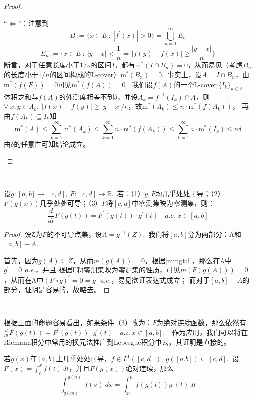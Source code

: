 \documentclass[color=green,thmcnt=section,lang=cn,12pt]{elegantbook}
\numberwithin{equation}{section}%
\numberwithin{figure}{section}%
\newcommand{\RR}{\mathbb{R}}
\newcommand{\ZZ}{\mathbb{Z}}
\newcommand{\any}{\forall \ }
\newcommand{\csf}[1]{\{#1_k\}_{k\in \ZZ_+}} %
\newcommand{\cu}[1]{\bigcup_{#1=1}^{\infty}} %
\newcommand{\cs}[1]{\sum_{#1=1}^{\infty}} %
\newcommand{\mx}[1]{\textrm{m}^*(#1)} %
\newcommand{\lcover}{\textrm{L-cover}} %
\begin{document}
\begin{proof}
\begin{enumerate}[(1)]
        ``$\Longleftarrow$''：注意到\begin{equation*}
            B:=\{x\in E\ :\ |f^{'}(x)|>0\}=\cu{n}E_n
        \end{equation*}
        \begin{equation*}
            E_n:=\{x\in E\ :\ |y-x|<\frac{1}{n}\Rightarrow |f(y)-f(x)|\geq \frac{|y-x|}{n}\}
        \end{equation*}
        断言，对于任意长度小于$1/n$的区间$I$，都有$\mx{I\cap B_n}=0$，从而易见（考虑$B_n$的长度小于$1/n$的区间构成的$\lcover$）$\mx{B_n}=0$.\ 
        事实上，设$A=I\cap B_n$，由$\mx{f(E)}=0$可见$\mx{f(A)}=0$，我们设$f(A)$的一个$\lcover\ \csf{I}$体积之和与$f(A)$的外测度相差不到$\delta$，并设$A_k=f^{-1}(I_k)\cap A$，则$\any x,y\in A_k,\ |f(x)-f(y)|\geq |y-x|/n$，故$\mx{A_k}\leq n\cdot \mx{f(A_k)}$，
        再由$f(A_k)\subseteq I_k$知
        \begin{equation*}
            \mx{A}\leq \cs{k}\mx{A_k}\leq \cs{k}n\cdot \mx{f(A_k)}\leq \cs{k}n\cdot \mx{I_k}\leq n\delta
        \end{equation*}
        由$\delta$的任意性可知结论成立。
    \end{enumerate}
\end{proof}
\ 



\begin{proposition}[复合函数求导]\label{fuhehanshuqiudao}
    设$g:[a,b]\to[c,d],\ F:[c,d]\to\RR$.\ 若：（1）$g,F$均几乎处处可导；（2）$F(g(x))$几乎处处可导；（3）$F$将$[c,d]$中零测集映为零测集，则：
    \begin{equation*}
        \frac{d}{dt}F(g(t))=F^{'}(g(t))\cdot g^{'}(t) \quad a.e.\ x\in[a,b]
    \end{equation*}
\end{proposition}
\begin{proof}
    设Z为$F$的不可导点集，设$A=g^{-1}(Z)$.\ 我们将$[a,b]$分为两部分：A和$[a,b]-A$.\ 


    首先，因为$g(A)\subseteq Z$，从而$m(g(A))=0$，根据\ref{mingti1}，那么在A中$g^{'}=0\ \ a.e.$，并且
    根据F将零测集映为零测集的性质，可见$m(F(g(A)))=0$，从而在A中$(F\circ g)^{'}=0=g^{'}\ \ a.e.$，易见欲证表达式成立；
    而对于$[a,b]-A$的部分，证明是容易的，故略去。
\end{proof}
\ 


根据上面的命题容易看出，如果条件（3）改为：$F$为绝对连续函数，那么依然有$  \frac{d}{dt}F(g(t))=F^{'}(g(t))\cdot g^{'}(t) \quad a.e.\ x\in[a,b]$.\ 
\ 作为应用，我们可以将在Riemann积分中常用的换元法推广到Lebesgue积分中去，其证明是直接的。
\begin{proposition}[换元积分]
    若$g(x)$在$[a,b]$上几乎处处可导，$f\in L^1([c,d]),\ g([a.b])\subseteq [c,d]$.\ 设$F(x)=\int_{c}^{x}f(t)\ dt$，并且$F(g(x))$绝对连续，那么
    \begin{equation*}
        \int_{g(m)}^{g(n)}f(x)\ dx=\int_{m}^{n}f(g(t))g^{'}(t)\ dt
    \end{equation*}
\end{proposition}
\end{document}
